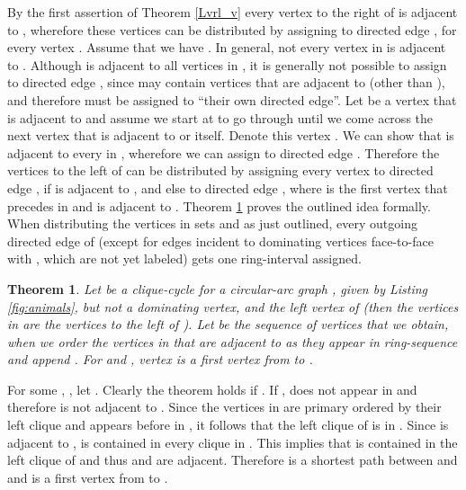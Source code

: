 \documentclass[10pt]{article}
\newtheorem{theorem}{Theorem}[section]
\newenvironment{proof}{\noindent{\bf Proof~}}{\null\hfill \par\medskip}
\newcommand{\q}[1]{``#1''}\newcommand{\fu}[1]{\mathcal{#1}}\newcommand{\mc}[1]{\mathsf{#1}}\newcommand{\ri}[1]{\mathscr{#1}}\newcommand{\co}[1]{\fu{C}({#1})}\newcommand{\lc}[1]{\alpha(#1)}\newcommand{\rc}[1]{\beta(#1)}\newcommand{\ema}[1]{\mathcal{#1}}\newcommand{\fe}[2]{\fu{F}(#1,#2)}\newcommand{\lv}[1]{l_{#1}}\newcommand{\rv}[1]{r_{#1}}\newcommand{\mv}[1]{m_{#1}}\newcommand{\lvv}{\lv{v}}
\begin{document}
By the first assertion of Theorem \ref{Lvrl_v} every vertex to the right of  is 
adjacent to , wherefore these vertices can be distributed by assigning  
to directed edge , for every vertex . 
Assume that we have .
In general, not every vertex in  is adjacent to . Although  is adjacent to all vertices in , it is generally not possible to assign 
 to directed edge , since  may contain vertices that are adjacent to  (other than ), and therefore must be assigned 
to \q{their own directed edge}.
Let  be a vertex that is adjacent to  and assume we start at  to go through 
 until we come across the next vertex that is adjacent to  or  itself.
Denote this vertex .
We can show that  is adjacent to every in , wherefore we 
can assign  to directed edge .
Therefore the vertices to the left of  can be distributed by assigning every vertex 
 to directed edge , if  is adjacent to , and else to directed edge , where  
is the first vertex that precedes  in  and is adjacent to  .
Theorem \ref{theototheleft} proves the outlined idea formally.
When distributing the vertices in sets  and  as just outlined, every 
outgoing directed edge of  (except for edges incident to dominating vertices face-to-face with , which are not yet labeled) gets one ring-interval assigned.




\begin{theorem}\label{theototheleft}
Let  be a clique-cycle for a circular-arc graph ,  
given by Listing \ref{fig:animals},  but not a dominating vertex, and  
the left vertex of  (then the vertices in  are the vertices to 
the left of ).
Let  be the sequence of vertices that we obtain, when we order the vertices in  that are adjacent to  as they appear in ring-sequence  and append .
For  and , vertex  is a first vertex 
from  to .
\end{theorem}



\begin{proof}
For some , , let .
Clearly the theorem holds if .
If ,  does not appear in  and therefore is not 
adjacent to . Since the vertices in  are primary ordered by their left clique 
and  appears before  in , it follows that the left 
clique of  is in . Since  is adjacent to ,  
is contained in every clique in .
This implies that  is contained in the left clique of  and thus  and  
are adjacent. Therefore  is a shortest path between  and  and  
is a first vertex from  to .
\end{proof}
\end{document}
